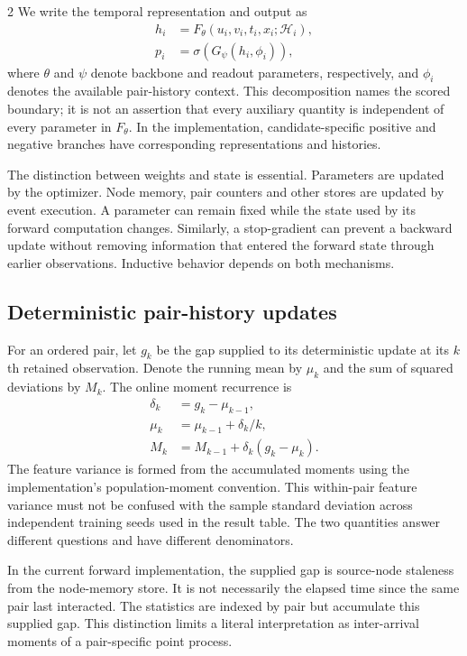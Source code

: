 \documentclass[a4paper,10pt]{article}
\begin{document}
\begin{multicols}{2}
We write the temporal representation and output as
\begin{align}
h_i&=F_\theta(u_i,v_i,t_i,x_i;\mathcal H_i),\nonumber\\
p_i&=\sigma(G_\psi(h_i,\phi_i)),
\label{eq:model}
\end{align}
where $\theta$ and $\psi$ denote backbone and readout parameters, respectively, and $\phi_i$ denotes the available pair-history context. This decomposition names the scored boundary; it is not an assertion that every auxiliary quantity is independent of every parameter in $F_\theta$. In the implementation, candidate-specific positive and negative branches have corresponding representations and histories.

The distinction between weights and state is essential. Parameters are updated by the optimizer. Node memory, pair counters and other stores are updated by event execution. A parameter can remain fixed while the state used by its forward computation changes. Similarly, a stop-gradient can prevent a backward update without removing information that entered the forward state through earlier observations. Inductive behavior depends on both mechanisms.

\subsection{Deterministic pair-history updates}
For an ordered pair, let $g_k$ be the gap supplied to its deterministic update at its $k$th retained observation. Denote the running mean by $\mu_k$ and the sum of squared deviations by $M_k$. The online moment recurrence is
\begin{align}
\delta_k&=g_k-\mu_{k-1},\nonumber\\
\mu_k&=\mu_{k-1}+\delta_k/k,\nonumber\\
M_k&=M_{k-1}+\delta_k(g_k-\mu_k).
\label{eq:welford}
\end{align}
The feature variance is formed from the accumulated moments using the implementation's population-moment convention. This within-pair feature variance must not be confused with the sample standard deviation across independent training seeds used in the result table. The two quantities answer different questions and have different denominators.

In the current forward implementation, the supplied gap is source-node staleness from the node-memory store. It is not necessarily the elapsed time since the same pair last interacted. The statistics are indexed by pair but accumulate this supplied gap. This distinction limits a literal interpretation as inter-arrival moments of a pair-specific point process.


\end{multicols}
\end{document}
